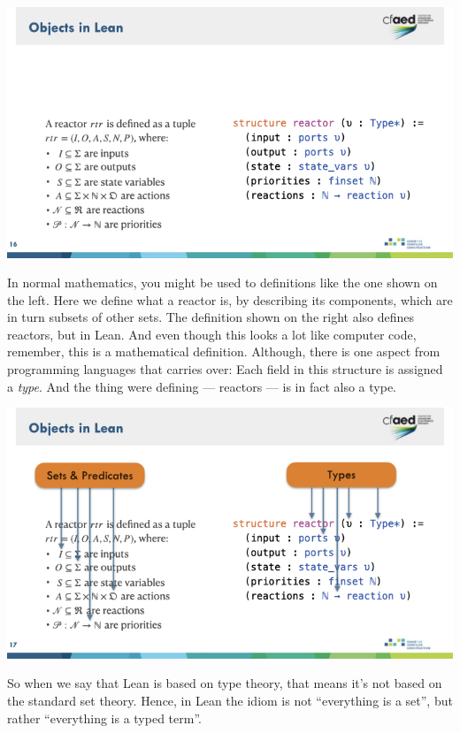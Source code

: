 \documentclass{article}
\begin{document}
\begin{center}
    \includegraphics[width=\columnwidth]{Slides/Slide 16.jpeg}
\end{center}

In normal mathematics, you might be used to definitions like the one shown on the left.
Here we define what a reactor is, by describing its components, which are in turn subsets of other sets.
The definition shown on the right also defines reactors, but in Lean.
And even though this looks a lot like computer code, remember, this is a mathematical definition.
Although, there is one aspect from programming languages that carries over:
Each field in this structure is assigned a \emph{type}.
And the thing were defining --- reactors --- is in fact also a type.

\begin{center}
    \includegraphics[width=\columnwidth]{Slides/Slide 17.jpeg}
\end{center}

So when we say that Lean is based on type theory, that means it's not based on the standard set theory.
Hence, in Lean the idiom is not ``everything is a set'', but rather ``everything is a typed term''.
\end{document}
